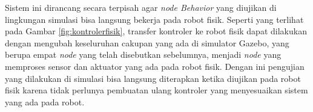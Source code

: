 Sistem ini dirancang secara terpisah agar \emph{node Behavior} yang diujikan di lingkungan simulasi bisa langsung bekerja pada robot fisik.
Seperti yang terlihat pada Gambar \ref{fig:kontrolerfisik}, transfer kontroler ke robot fisik dapat dilakukan dengan mengubah keseluruhan cakupan yang ada di simulator Gazebo, yang berupa empat \emph{node} yang telah disebutkan sebelumnya, menjadi \emph{node} yang memproses sensor dan aktuator yang ada pada robot fisik.
Dengan ini pengujian yang dilakukan di simulasi bisa langsung diterapkan ketika diujikan pada robot fisik karena tidak perlunya pembuatan ulang kontroler yang menyesuaikan sistem yang ada pada robot.
